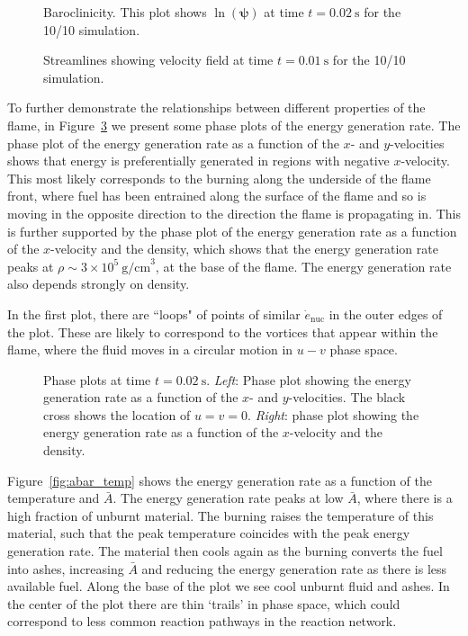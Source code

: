 \documentclass[preprint,times,tighten]{aastex63}
\begin{document}
\begin{figure}[t]
\centering
{}
\caption{\label{fig:baroclinicity} Baroclinicity. This plot shows
$\ln \left(\mathbf{\psi}\right)$ at time $t = 0.02~\mathrm{s}$ for the 10/10 simulation.}
\end{figure}

\begin{figure}[t]
	\centering
	\caption{\label{fig:streamlines} Streamlines showing velocity field at time $t = 0.01~\mathrm{s}$ for the 10/10 simulation.}
\end{figure}

To further demonstrate the relationships between different properties
of the flame, in Figure~\ref{fig:phase_plots} we present some phase
plots of the energy generation rate. The phase plot of the energy
generation rate as a function of the $x$- and $y$-velocities shows
that energy is preferentially generated in regions with negative
$x$-velocity. This most likely corresponds to the burning along the
underside of the flame front, where fuel has been entrained along the
surface of the flame and so is moving in the opposite direction to the
direction the flame is propagating in. This is further supported by
the phase plot of the energy generation rate as a function of the
$x$-velocity and the density, which shows that the energy generation
rate peaks at $\rho \sim 3 \times 10^5~\mathrm{g/cm}^3$, at the base
of the flame.  The energy generation rate also depends strongly on density.

In the first plot, there are ``loops" of
points of similar $\dot{e}_\mathrm{nuc}$ in the outer edges of the plot.
These are likely to correspond to the vortices that appear within the flame,
where the fluid moves in a circular motion in $u-v$ phase space.

\begin{figure}[t]
\centering
{}
\caption{\label{fig:phase_plots} Phase plots at time $t = 0.02~\mathrm{s}$.
\emph{Left}: Phase plot showing the energy generation rate as a function of
the $x$- and $y$-velocities. The black cross shows the location of $u = v = 0$. \emph{Right}: phase plot showing the energy
generation rate as a function of the $x$-velocity and the density.}
\end{figure}

Figure~\ref{fig:abar_temp} shows the energy generation rate as a function of the
temperature and $\bar{A}$. 
The energy generation rate peaks at low $\bar{A}$, where there is a high fraction
of unburnt material. The burning raises the temperature of this material, such
that the peak temperature coincides with the peak energy generation rate. The
material then cools again as the burning converts the fuel into ashes,
increasing $\bar{A}$ and reducing the energy generation rate as there is
less available fuel. Along the base of the plot we see cool unburnt fluid and
ashes. In the center of the plot there are thin `trails' in phase space, which
could correspond to less common reaction pathways in the reaction network.
\end{document}
